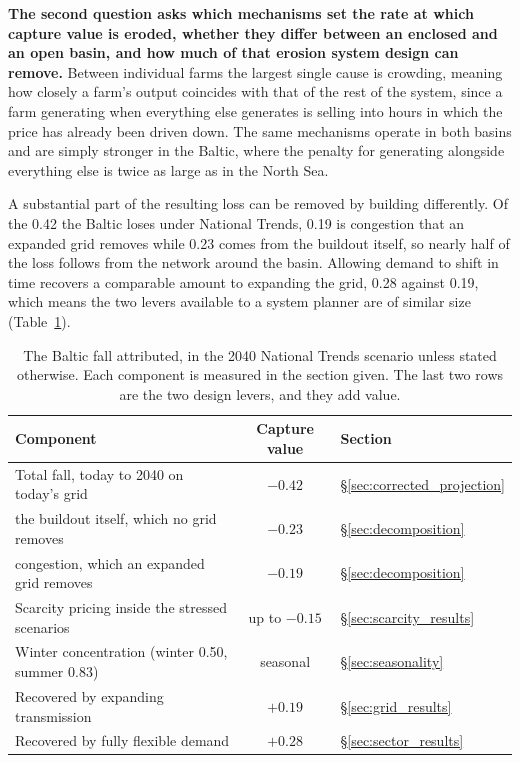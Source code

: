 \textbf{The second question asks which mechanisms set the rate at which capture
value is eroded, whether they differ between an enclosed and an open basin, and
how much of that erosion system design can remove.} Between individual farms the
largest single cause is crowding, meaning how closely a farm's output coincides
with that of the rest of the system, since a farm generating when everything
else generates is selling into hours in which the price has already been driven
down. The same mechanisms operate in both basins and are simply stronger in the
Baltic, where the penalty for generating alongside everything else is twice as
large as in the North Sea.

A substantial part of the resulting loss can be removed by building differently.
Of the 0.42 the Baltic loses under National Trends, 0.19 is congestion that an
expanded grid removes while 0.23 comes from the buildout itself, so nearly half
of the loss follows from the network around the basin. Allowing demand to shift
in time recovers a comparable amount to expanding the grid, 0.28 against 0.19,
which means the two levers available to a system planner are of similar size
(Table~\ref{tab:drivers}).

\begin{table}[!htb]
\centering\small
\caption{The Baltic fall attributed, in the 2040 National Trends scenario
unless stated otherwise. Each component is measured in the section given. The
last two rows are the two design levers, and they add value.}
\label{tab:drivers}
\begin{tabular}{l c l}
\toprule
\textbf{Component} & \textbf{Capture value} & \textbf{Section} \\
\midrule
Total fall, today to 2040 on today's grid & $-0.42$ &
\S\ref{sec:corrected_projection} \\
\quad the buildout itself, which no grid removes & $-0.23$ &
\S\ref{sec:decomposition} \\
\quad congestion, which an expanded grid removes & $-0.19$ &
\S\ref{sec:decomposition} \\
Scarcity pricing inside the stressed scenarios & up to $-0.15$ &
\S\ref{sec:scarcity_results} \\
Winter concentration (winter 0.50, summer 0.83) & seasonal &
\S\ref{sec:seasonality} \\
Recovered by expanding transmission & $+0.19$ & \S\ref{sec:grid_results} \\
Recovered by fully flexible demand & $+0.28$ & \S\ref{sec:sector_results} \\
\bottomrule
\end{tabular}
\end{table}

